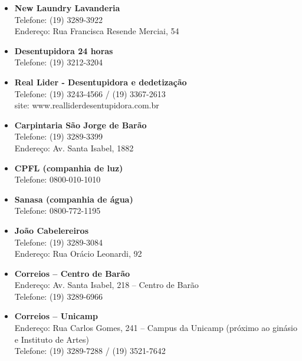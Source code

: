 \begin{itemize}
    \item  \textbf{New Laundry Lavanderia}
        \\Telefone: (19) 3289-3922
        \\Endereço: Rua Francisca Resende Merciai, 54

    \item  \textbf{Desentupidora 24 horas}
        \\Telefone: (19) 3212-3204
    
    \item  \textbf{Real Lider - Desentupidora e dedetização}
        \\Telefone: (19) 3243-4566 / (19) 3367-2613
        \\site: www.realliderdesentupidora.com.br

    \item  \textbf{Carpintaria São Jorge de Barão}
        \\Telefone: (19) 3289-3399
        \\Endereço: Av. Santa Isabel, 1882

    \item  \textbf{CPFL (companhia de luz)}
        \\Telefone: 0800-010-1010

    \item  \textbf{Sanasa (companhia de água)}
        \\Telefone: 0800-772-1195


    \item  \textbf{João Cabelereiros}
        \\Telefone: (19) 3289-3084
        \\Endereço: Rua Orácio Leonardi, 92

    \item  \textbf{Correios -- Centro de Barão}
        \\Endereço: Av. Santa Isabel, 218 -- Centro de Barão
        \\Telefone: (19) 3289-6966

    \item  \textbf{Correios -- Unicamp}
        \\Endereço: Rua Carlos Gomes, 241 -- Campus da Unicamp (próximo ao ginásio e Instituto de Artes)
        \\Telefone: (19) 3289-7288 / (19) 3521-7642
\end{itemize}


